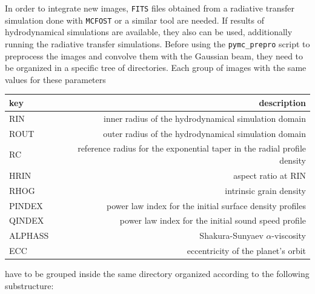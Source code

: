 \documentclass[a4paper,10pt]{report}
\begin{document}
In order to integrate new images, \lstinline{FITS} files obtained from a radiative 
transfer simulation done with \lstinline{MCFOST} or a similar tool are needed. If results of hydrodynamical 
simulations are available, they also can be used, additionally running the radiative transfer simulations.
Before using the \lstinline{pymc_prepro} script to preprocess the images and convolve them with the Gaussian beam,
they need to be organized in a specific tree of directories.
Each group of images with the same values for these parameters

\begin{center}
    \begin{tabular}{lr}
        \toprule
        key & description \\
        \midrule
        RIN & inner radius of the hydrodynamical simulation domain \\
        ROUT & outer radius of the hydrodynamical simulation domain\\
        RC & reference radius for the exponential taper in the radial profile density\\ 
        HRIN & aspect ratio at RIN \\ 
        RHOG & intrinsic grain density\\ 
        PINDEX & power law index for the initial surface density profiles\\
        QINDEX & power law index for the initial sound speed profile \\
        ALPHASS & Shakura-Sunyaev $\alpha$-viscosity\\
        ECC & eccentricity of the planet's orbit\\
        \bottomrule        
    \end{tabular}
\end{center}

\noindent have to be grouped inside the same directory organized according to the following substructure:
\end{document}
